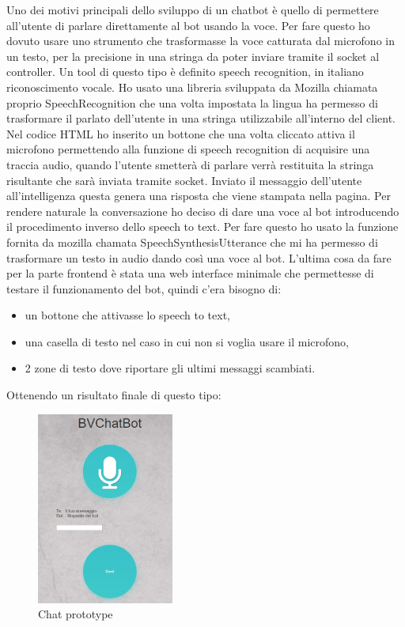 Uno dei motivi principali dello sviluppo di un chatbot è quello di permettere all'utente di parlare direttamente al bot usando la voce. Per fare questo ho dovuto usare uno strumento che trasformasse la voce catturata dal microfono in un testo, per la precisione in una stringa da poter inviare tramite il socket al controller. Un tool di questo tipo è definito speech recognition, in italiano riconoscimento vocale.
Ho usato una libreria sviluppata da Mozilla chiamata proprio SpeechRecognition che una volta impostata la lingua ha permesso di trasformare il parlato dell'utente in una stringa utilizzabile all'interno del client.
Nel codice HTML ho inserito un bottone che una volta cliccato attiva il microfono permettendo alla funzione di speech recognition di acquisire una traccia audio, quando l'utente smetterà di parlare verrà restituita la stringa risultante che sarà inviata tramite socket.
Inviato il messaggio dell'utente all'intelligenza questa genera una risposta che viene stampata nella pagina. Per rendere naturale la conversazione ho deciso di dare una voce al bot introducendo il procedimento inverso dello speech to text. Per fare questo ho usato la funzione fornita da mozilla chamata SpeechSynthesisUtterance che mi ha permesso di trasformare un testo in audio dando così una voce al bot.
L'ultima cosa da fare per la parte frontend è stata una web interface minimale che permettesse di testare il funzionamento del bot, quindi c'era bisogno di:
\begin{itemize}
\item un bottone che attivasse lo speech to text,
\item una casella di testo nel caso in cui non si voglia usare il microfono,
\item 2 zone di testo dove riportare gli ultimi messaggi scambiati.
\end{itemize}
Ottenendo un risultato finale di questo tipo:
\begin{figure}[H]
 \centering
  \includegraphics[width=0.4\textwidth]{img/prototype.png}
 \caption{Chat prototype}
\end{figure}
